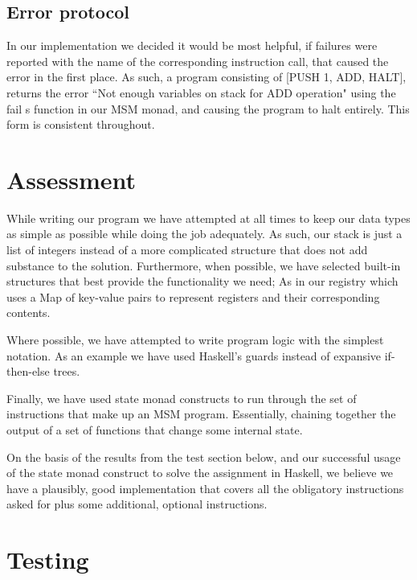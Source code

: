 \documentclass[]{article}
\begin{document}
\subsection{Error protocol}

In our implementation we decided it would be most helpful, if failures were reported with the name of the corresponding instruction call, that caused the error in the first place. As such, a program consisting of [PUSH 1, ADD, HALT], returns the error “Not enough variables on stack for ADD operation" using the fail s function in our MSM monad, and causing the program to halt entirely. This form is consistent throughout.\par

\section{Assessment}

While writing our program we have attempted at all times to keep our data types as simple as possible while doing the job adequately. As such, our stack is just a list of integers instead of a more complicated structure that does not add substance to the solution. Furthermore, when possible, we have selected built-in structures that best provide the functionality we need; As in our registry which uses a Map of key-value pairs to represent registers and their corresponding contents.\par
Where possible, we have attempted to write program logic with the simplest notation. As an example we have used Haskell’s guards instead of expansive if-then-else trees.\par
Finally, we have used state monad constructs to run through the set of instructions that make up an MSM program. Essentially, chaining together the output of a set of functions that change some internal state.\par
On the basis of the results from the test section below, and our successful usage of the state monad construct to solve the assignment in Haskell, we believe we have a plausibly, good implementation that covers all the obligatory instructions asked for plus some additional, optional instructions.   \par

\section{Testing}
\end{document}
